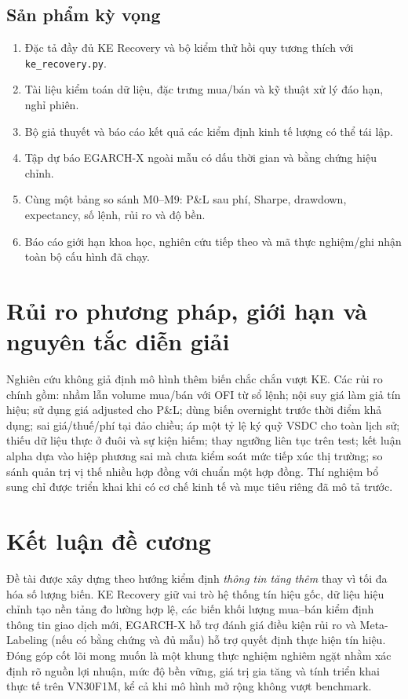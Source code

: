 \documentclass[12pt,a4paper,oneside]{article}
\begin{document}
\subsection{Sản phẩm kỳ vọng}
\begin{enumerate}
\item Đặc tả đầy đủ KE Recovery và bộ kiểm thử hồi quy tương thích với \texttt{ke\_recovery.py}.
\item Tài liệu kiểm toán dữ liệu, đặc trưng mua/bán và kỹ thuật xử lý đáo hạn, nghỉ phiên.
\item Bộ giả thuyết và báo cáo kết quả các kiểm định kinh tế lượng có thể tái lập.
\item Tập dự báo EGARCH-X ngoài mẫu có dấu thời gian và bằng chứng hiệu chỉnh.
\item Cùng một bảng so sánh M0--M9: P\&L sau phí, Sharpe, drawdown, expectancy, số lệnh, rủi ro và độ bền.
\item Báo cáo giới hạn khoa học, nghiên cứu tiếp theo và mã thực nghiệm/ghi nhận toàn bộ cấu hình đã chạy.
\end{enumerate}

\section{Rủi ro phương pháp, giới hạn và nguyên tắc diễn giải}
Nghiên cứu không giả định mô hình thêm biến chắc chắn vượt KE. Các rủi ro chính gồm: nhầm lẫn volume mua/bán với OFI từ sổ lệnh; nội suy giá làm giả tín hiệu; sử dụng giá adjusted cho P\&L; dùng biến overnight trước thời điểm khả dụng; sai giá/thuế/phí tại đảo chiều; áp một tỷ lệ ký quỹ VSDC cho toàn lịch sử; thiếu dữ liệu thực ở đuôi và sự kiện hiếm; thay ngưỡng liên tục trên test; kết luận alpha dựa vào hiệp phương sai mà chưa kiểm soát mức tiếp xúc thị trường; so sánh quản trị vị thế nhiều hợp đồng với chuẩn một hợp đồng. Thí nghiệm bổ sung chỉ được triển khai khi có cơ chế kinh tế và mục tiêu riêng đã mô tả trước.

\section{Kết luận đề cương}
Đề tài được xây dựng theo hướng kiểm định \emph{thông tin tăng thêm} thay vì tối đa hóa số lượng biến. KE Recovery giữ vai trò hệ thống tín hiệu gốc, dữ liệu hiệu chỉnh tạo nền tảng đo lường hợp lệ, các biến khối lượng mua--bán kiểm định thông tin giao dịch mới, EGARCH-X hỗ trợ đánh giá điều kiện rủi ro và Meta-Labeling (nếu có bằng chứng và đủ mẫu) hỗ trợ quyết định thực hiện tín hiệu. Đóng góp cốt lõi mong muốn là một khung thực nghiệm nghiêm ngặt nhằm xác định rõ nguồn lợi nhuận, mức độ bền vững, giá trị gia tăng và tính triển khai thực tế trên VN30F1M, kể cả khi mô hình mở rộng không vượt benchmark.
\end{document}
